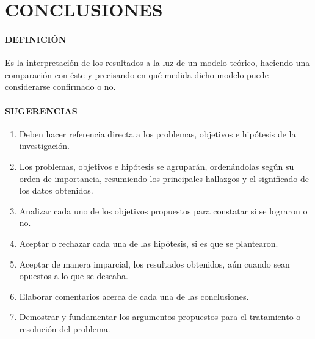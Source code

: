 \section{CONCLUSIONES}

\paragraph{DEFINICIÓN}
Es la interpretación de los resultados a la luz de un modelo teórico, haciendo una comparación con éste y precisando en qué medida dicho modelo puede considerarse confirmado o no.

\paragraph{SUGERENCIAS}

\begin{enumerate}
 \item Deben hacer referencia directa a los problemas, objetivos e hipótesis de la investigación.
 \item Los problemas, objetivos e hipótesis se agruparán, ordenándolas según su orden de importancia, resumiendo los principales hallazgos y el significado de los datos obtenidos.
 \item Analizar cada uno de los objetivos propuestos para constatar si se lograron o no.
 \item Aceptar o rechazar cada una de  las hipótesis, si es que se plantearon.
 \item Aceptar de manera imparcial, los resultados obtenidos, aún cuando sean opuestos a lo que se deseaba.
 \item Elaborar comentarios acerca de cada una de las conclusiones.
 \item Demostrar y fundamentar los argumentos propuestos para el tratamiento o resolución del problema.
\end{enumerate}